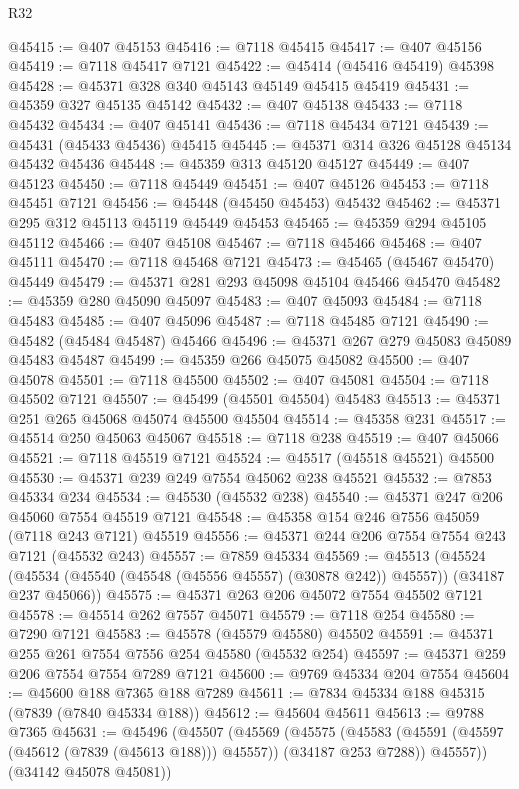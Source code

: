 \begin{lexlean}{R32}
\begin{coremodule}
@45415 := @407 @45153
@45416 := @7118 @45415
@45417 := @407 @45156
@45419 := @7118 @45417 @7121
@45422 := @45414 (@45416 @45419) @45398
@45428 := @45371 @328 @340 @45143 @45149 @45415 @45419
@45431 := @45359 @327 @45135 @45142
@45432 := @407 @45138
@45433 := @7118 @45432
@45434 := @407 @45141
@45436 := @7118 @45434 @7121
@45439 := @45431 (@45433 @45436) @45415
@45445 := @45371 @314 @326 @45128 @45134 @45432 @45436
@45448 := @45359 @313 @45120 @45127
@45449 := @407 @45123
@45450 := @7118 @45449
@45451 := @407 @45126
@45453 := @7118 @45451 @7121
@45456 := @45448 (@45450 @45453) @45432
@45462 := @45371 @295 @312 @45113 @45119 @45449 @45453
@45465 := @45359 @294 @45105 @45112
@45466 := @407 @45108
@45467 := @7118 @45466
@45468 := @407 @45111
@45470 := @7118 @45468 @7121
@45473 := @45465 (@45467 @45470) @45449
@45479 := @45371 @281 @293 @45098 @45104 @45466 @45470
@45482 := @45359 @280 @45090 @45097
@45483 := @407 @45093
@45484 := @7118 @45483
@45485 := @407 @45096
@45487 := @7118 @45485 @7121
@45490 := @45482 (@45484 @45487) @45466
@45496 := @45371 @267 @279 @45083 @45089 @45483 @45487
@45499 := @45359 @266 @45075 @45082
@45500 := @407 @45078
@45501 := @7118 @45500
@45502 := @407 @45081
@45504 := @7118 @45502 @7121
@45507 := @45499 (@45501 @45504) @45483
@45513 := @45371 @251 @265 @45068 @45074 @45500 @45504
@45514 := @45358 @231
@45517 := @45514 @250 @45063 @45067
@45518 := @7118 @238
@45519 := @407 @45066
@45521 := @7118 @45519 @7121
@45524 := @45517 (@45518 @45521) @45500
@45530 := @45371 @239 @249 @7554 @45062 @238 @45521
@45532 := @7853 @45334 @234
@45534 := @45530 (@45532 @238)
@45540 := @45371 @247 @206 @45060 @7554 @45519 @7121
@45548 := @45358 @154 @246 @7556 @45059 (@7118 @243 @7121) @45519
@45556 := @45371 @244 @206 @7554 @7554 @243 @7121 (@45532 @243)
@45557 := @7859 @45334
@45569 := @45513
    (@45524 (@45534 (@45540 (@45548 (@45556 @45557) (@30878 @242)) @45557)) (@34187 @237 @45066))
@45575 := @45371 @263 @206 @45072 @7554 @45502 @7121
@45578 := @45514 @262 @7557 @45071
@45579 := @7118 @254
@45580 := @7290 @7121
@45583 := @45578 (@45579 @45580) @45502
@45591 := @45371 @255 @261 @7554 @7556 @254 @45580 (@45532 @254)
@45597 := @45371 @259 @206 @7554 @7554 @7289 @7121
@45600 := @9769 @45334 @204 @7554
@45604 := @45600 @188 @7365 @188 @7289
@45611 := @7834 @45334 @188 @45315 (@7839 (@7840 @45334 @188))
@45612 := @45604 @45611
@45613 := @9788 @7365
@45631 := @45496
    (@45507
      (@45569
        (@45575
          (@45583 (@45591 (@45597 (@45612 (@7839 (@45613 @188))) @45557)) (@34187 @253 @7288))
          @45557))
      (@34142 @45078 @45081))

\end{coremodule}
\end{lexlean}
